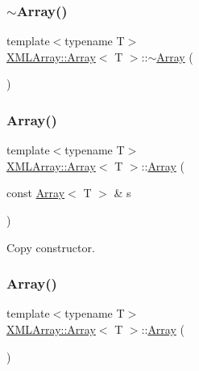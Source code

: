 \subsubsection{\texorpdfstring{$\sim$Array()}{~Array()}\hspace{0.1cm}{\footnotesize\ttfamily [1/3]}}
{\footnotesize\ttfamily template$<$typename T$>$ \\
\mbox{\hyperlink{classXMLArray_1_1Array}{X\+M\+L\+Array\+::\+Array}}$<$ T $>$\+::$\sim$\mbox{\hyperlink{classXMLArray_1_1Array}{Array}} (\begin{DoxyParamCaption}{ }\end{DoxyParamCaption})\hspace{0.3cm}{\ttfamily [inline]}}

\mbox{\label{classXMLArray_1_1Array_ab755ad52a24c32ad23940b23b1d03968}} 
\subsubsection{\texorpdfstring{Array()}{Array()}\hspace{0.1cm}{\footnotesize\ttfamily [3/9]}}
{\footnotesize\ttfamily template$<$typename T$>$ \\
\mbox{\hyperlink{classXMLArray_1_1Array}{X\+M\+L\+Array\+::\+Array}}$<$ T $>$\+::\mbox{\hyperlink{classXMLArray_1_1Array}{Array}} (\begin{DoxyParamCaption}\item[{const \mbox{\hyperlink{classXMLArray_1_1Array}{Array}}$<$ T $>$ \&}]{s }\end{DoxyParamCaption})\hspace{0.3cm}{\ttfamily [inline]}}



Copy constructor. 

\mbox{\label{classXMLArray_1_1Array_a5b81635bef141ec21cbb11a4ae235aff}} 
\subsubsection{\texorpdfstring{Array()}{Array()}\hspace{0.1cm}{\footnotesize\ttfamily [4/9]}}
{\footnotesize\ttfamily template$<$typename T$>$ \\
\mbox{\hyperlink{classXMLArray_1_1Array}{X\+M\+L\+Array\+::\+Array}}$<$ T $>$\+::\mbox{\hyperlink{classXMLArray_1_1Array}{Array}} (\begin{DoxyParamCaption}{ }\end{DoxyParamCaption})\hspace{0.3cm}{\ttfamily [inline]}}

